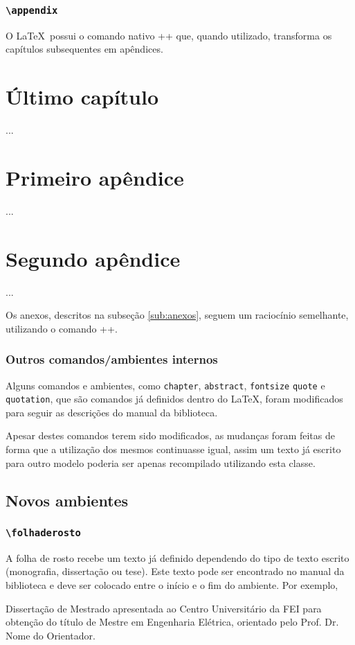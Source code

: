 \documentclass[xindy,rascunho]{fei}
\begin{document}
	\subsection{\texttt{\textbackslash appendix}}
	
	O \LaTeX\ possui o comando nativo \latexinline+\appendix+ que, quando utilizado, transforma os capítulos subsequentes em apêndices.
	
	\begin{latexcode}
	\chapter{Último capítulo}
	...
	\appendix
	\chapter{Primeiro apêndice}
	...
	\chapter{Segundo apêndice}
	...
	\end{latexcode}
	
	Os anexos, descritos na subseção \ref{sub:anexos}, seguem um raciocínio semelhante, utilizando o comando \latexinline+\anexos+.
    
    \subsection{Outros comandos/ambientes internos}
    
    Alguns comandos e ambientes, como \texttt{chapter}, \texttt{abstract}, \texttt{fontsize} \texttt{quote} e \texttt{quotation}, que são comandos já definidos dentro do \LaTeX, foram modificados para seguir as descrições do manual da biblioteca.

    Apesar destes comandos terem sido modificados, as mudanças foram feitas de forma que a utilização dos mesmos continuasse igual, assim um texto já escrito para outro modelo poderia ser apenas recompilado utilizando esta classe.

\section{Novos ambientes}

    \subsection{\texttt{\textbackslash folhaderosto}}
    A folha de rosto recebe um texto já definido dependendo do tipo de texto escrito (monografia, dissertação ou tese). Este texto pode ser encontrado no manual da biblioteca e deve ser colocado entre o início e o fim do ambiente. Por exemplo,
    \begin{latexcode}
\begin{folhaderosto}
Dissertação de Mestrado apresentada ao Centro Universitário
da FEI para obtenção do título de Mestre em Engenharia
Elétrica, orientado pelo Prof. Dr. Nome do Orientador. 
\end{folhaderosto}
    \end{latexcode}
\end{document}
